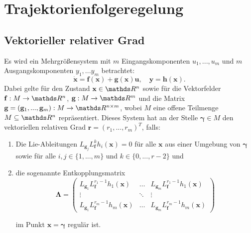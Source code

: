 \section{Trajektorienfolgeregelung}

\subsection{Vektorieller relativer Grad}
\label{sec:definition_relative_degree}
Es wird ein Mehrgrößensystem mit $m$ Eingangskomponenten $u_1, ..., u_m$ und $m$ Ausgangskomponenten $y_1, ... y_m$ betrachtet:
\begin{equation}
	\label{eq:state_space_vector_degree}
	\dot{\mathbf{x}} = \mathbf{f}(\mathbf{x}) + \mathbf{g}(\mathbf{x}) \mathbf{u}, \quad \mathbf{y} = \mathbf{h}(\mathbf{x}).
\end{equation}
Dabei gelte für den Zustand $\mathbf{x} \in \Reals^n$ sowie für die Vektorfelder $\mathbf{f}: M \rightarrow \Reals^n$, $\mathbf{g}: M \rightarrow \Reals^m$ und die Matrix $\mathbf{g} = (\mathbf{g}_1, ..., \mathbf{g}_m): M \rightarrow \Reals^{n \times m}$, wobei $M$ eine offene Teilmenge $M \subseteq \Reals^{n}$ repräsentiert. Dieses System hat an der Stelle $\boldsymbol{\gamma} \in M$ den vektoriellen relativen Grad $\mathbf{r} = (r_1, ..., r_m)^T$, falls:
\begin{enumerate}
	\item Die Lie-Ableitungen $L_{\mathbf{g}_j} L_{\mathbf{f}}^k h_i(\mathbf{x}) = 0$ für alle $\mathbf{x}$ aus einer Umgebung von $\boldsymbol{\gamma}$ sowie für alle $i,j \in \{1, ..., m\}$ und $k \in \{0, ..., r-2\}$ und
	\item die sogenannte Entkopplungsmatrix
		\begin{equation}
		\label{eq:decoupling_matrix}
		\boldsymbol{\Lambda} = 
		\left(\begin{matrix}
		L_{\mathbf{g}_1} L_{\mathbf{f}}^{r_1 -1} h_1(\mathbf{x}) & \hdots & L_{\mathbf{g}_m} L_{\mathbf{f}}^{r_1 -1} h_1(\mathbf{x}) \\
		\vdots & \ddots & \vdots \\
		L_{\mathbf{g}_1} L_{\mathbf{f}}^{r_m -1} h_m(\mathbf{x}) & \hdots & L_{\mathbf{g}_m} L_{\mathbf{f}}^{r_m -1} h_m(\mathbf{x})
		\end{matrix}\right) 
	\end{equation}
	
	im Punkt $\mathbf{x} = \boldsymbol{\gamma}$ regulär ist.
\end{enumerate}
\cite[S. 194]{NLRT_Roebenack}

